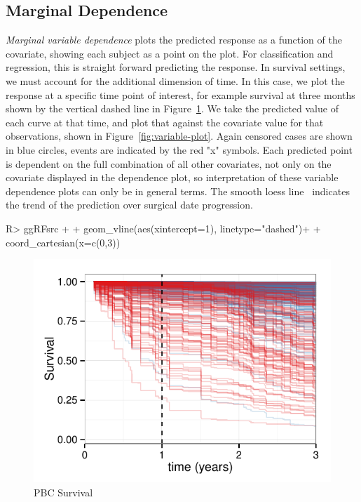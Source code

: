 \documentclass[nojss]{jss}\usepackage[]{graphicx}\usepackage[]{color}
\makeatletter
\def\maxwidth{ %
  \ifdim\Gin@nat@width>\linewidth
    \linewidth
  \else
    \Gin@nat@width
  \fi
}
\makeatother
\begin{document}
\subsection{Marginal Dependence}\label{S:variableDependence}
\emph{Marginal variable dependence} plots the predicted response as a function of the covariate, showing each subject as a point on the plot. For classification and regression, this is straight forward predicting the response. In survival settings, we must account for the additional dimension of time. In this case, we plot the response at a specific time point of interest, for example survival at three months shown by the vertical dashed line in Figure~\ref{fig:rfsrc-plot3Mnth}. We take the predicted value of each curve at that time, and plot that against the covariate value for that observations, shown in Figure~\ref{fig:variable-plot}. Again censored cases are shown in blue circles, events are indicated by the red "x" symbols. Each predicted point is dependent on the full combination of all other covariates, not only on the covariate displayed in the dependence plot, so interpretation of these variable dependence plots can only be in general terms. The smooth loess line~\citep{cleveland:1981, cleveland:1988} indicates the trend of the prediction over surgical date progression.

\begin{Schunk}
\begin{Sinput}
R> ggRFsrc +
+   geom_vline(aes(xintercept=1), linetype="dashed")+
+   coord_cartesian(x=c(0,3))
\end{Sinput}
\begin{figure}[!htpb]

{\centering \includegraphics[width=\maxwidth]{figure/rfs-rfsrc-plot3Mnth-1} 

}

\caption[PBC Survival]{PBC Survival\label{fig:rfsrc-plot3Mnth}}
\end{figure}
\end{Schunk}
\end{document}
